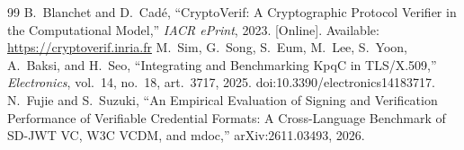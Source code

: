 \documentclass[10pt,twocolumn]{IEEEtran}
\begin{document}
\begin{appendices}
\begin{thebibliography}{99}
   B.~Blanchet and D.~Cad{\'e}, ``CryptoVerif: A Cryptographic
    Protocol Verifier in the Computational Model,'' \emph{IACR ePrint},
    2023. [Online]. Available: \url{https://cryptoverif.inria.fr}
   M.~Sim, G.~Song, S.~Eum, M.~Lee, S.~Yoon, A.~Baksi,
    and H.~Seo, ``Integrating and Benchmarking KpqC in TLS/X.509,''
    \emph{Electronics}, vol.~14, no.~18, art.~3717, 2025.
    doi:10.3390/electronics14183717.
   N.~Fujie and S.~Suzuki, ``An Empirical Evaluation of
    Signing and Verification Performance of Verifiable Credential Formats:
    A Cross-Language Benchmark of SD-JWT VC, W3C VCDM, and mdoc,''
    arXiv:2611.03493, 2026.
  


\end{thebibliography}
\end{appendices}
\end{document}
